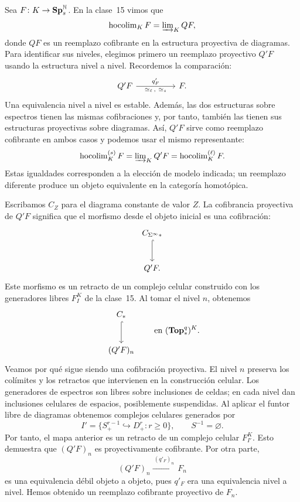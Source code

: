 Sea $F\colon K\to\mathbf{Sp}^{\mathbb N}_s$. En la clase~15 vimos que
\[
\operatorname{hocolim}_K F=\varinjlim\nolimits_K QF,
\]
donde $QF$ es un reemplazo cofibrante en la estructura proyectiva de diagramas. Para identificar sus niveles, elegimos primero un reemplazo proyectivo $Q'F$ usando la estructura nivel a nivel. Recordemos la comparación:
\[
\begin{tikzcd}[column sep=huge]
Q'F \arrow[r,"q'_F","{\simeq_\ell\,,\ \simeq_s}"'] & F.
\end{tikzcd}
\]
Una equivalencia nivel a nivel es estable. Además, las dos estructuras sobre espectros tienen las mismas cofibraciones y, por tanto, también las tienen sus estructuras proyectivas sobre diagramas. Así, $Q'F$ sirve como reemplazo cofibrante en ambos casos y podemos usar el mismo representante:
\[
\operatorname{hocolim}^{(s)}_K F
=\varinjlim\nolimits_K Q'F
=\operatorname{hocolim}^{(\ell)}_K F.
\]
Estas igualdades corresponden a la elección de modelo indicada; un reemplazo diferente produce un objeto equivalente en la categoría homotópica.

Escribamos $C_Z$ para el diagrama constante de valor $Z$. La cofibrancia proyectiva de $Q'F$ significa que el morfismo desde el objeto inicial es una cofibración:
\[
\begin{tikzcd}[row sep=large]
C_{\Sigma^\infty *}\arrow[d,hook]\\
Q'F.
\end{tikzcd}
\]
Este morfismo es un retracto de un complejo celular construido con los generadores libres $F_I^K$ de la clase~15. Al tomar el nivel $n$, obtenemos
\[
\begin{tikzcd}[row sep=large]
C_*\arrow[d,hook]\\
(Q'F)_n
\end{tikzcd}
\qquad\text{en }(\Topstar^q)^K.
\]
Veamos por qué sigue siendo una cofibración proyectiva. El nivel $n$ preserva los colímites y los retractos que intervienen en la construcción celular. Los generadores de espectros son libres sobre inclusiones de celdas; en cada nivel dan inclusiones celulares de espacios, posiblemente suspendidas. Al aplicar el funtor libre de diagramas obtenemos complejos celulares generados por
\[
I'=\{S^{r-1}_+\hookrightarrow D^r_+:r\ge0\},
\qquad S^{-1}=\varnothing.
\]
Por tanto, el mapa anterior es un retracto de un complejo celular $F_{I'}^K$. Esto demuestra que $(Q'F)_n$ es proyectivamente cofibrante. Por otra parte,
\[
(Q'F)_n\xrightarrow{\ (q'_F)_n\ }F_n
\]
es una equivalencia débil objeto a objeto, pues $q'_F$ era una equivalencia nivel a nivel. Hemos obtenido un reemplazo cofibrante proyectivo de $F_n$.

